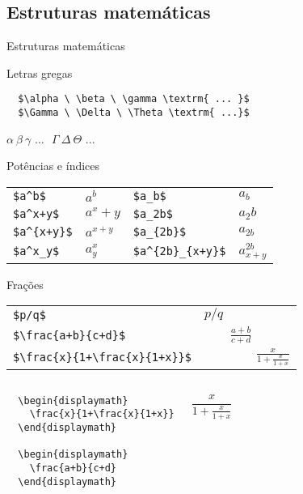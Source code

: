 \subsection{Estruturas matemáticas}

\begin{frame}{Estruturas matemáticas}
    \begin{block}{Letras gregas}
    \small{
\begin{verbatim}
  $\alpha \ \beta \ \gamma \textrm{ ... }$
  $\Gamma \ \Delta \ \Theta \textrm{ ...}$
\end{verbatim}
    \begin{center}
    $\alpha \  \beta \ \gamma \textrm{ ... }$
    $\Gamma \ \Delta \ \Theta \textrm{ ...}$
    \end{center}
        }
    \end{block}

    \begin{block}{Potências e índices}
    \small{
    \begin{tabular}{l l l l}
    \verb|$a^b$|        & $a^b$     & \verb|$a_b$|          & $a_b$         \\
    \verb|$a^x+y$|      & $a^x+y$   & \verb|$a_2b$|         & $a_2b$        \\
    \verb|$a^{x+y}$|    & $a^{x+y}$ & \verb|$a_{2b}$|       & $a_{2b}$      \\
    \verb|$a^x_y$|      & $a^x_y$   & \verb|$a^{2b}_{x+y}$| & $a^{2b}_{x+y}$
    \end{tabular}
    }
    \end{block}

    \begin{block}{Frações}
    \small{
    \begin{tabular}{l l}
    \verb|$p/q$|                        & $p/q$ \\
    \verb|$\frac{a+b}{c+d}$|            & $\qquad \frac{a+b}{c+d}$ \\
    \verb|$\frac{x}{1+\frac{x}{1+x}}$|  & $\qquad \qquad \frac{x}{1+\frac{x}{1+x}}$
    \end{tabular}
    }
    \begin{columns}
        \small{
\begin{verbatim}
  \begin{displaymath}
    \frac{x}{1+\frac{x}{1+x}}
  \end{displaymath}
  
  \begin{displaymath}
    \frac{a+b}{c+d}
  \end{displaymath}
\end{verbatim}
        }
        \small{
        \begin{displaymath}
        \frac{x}{1+\frac{x}{1+x}}
        \end{displaymath}
  
}
\end{columns}
\end{block}
\end{frame}
